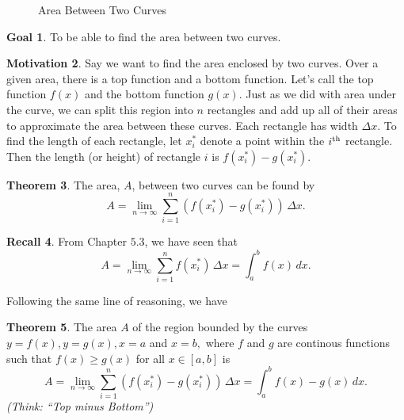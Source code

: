 \documentclass[letterpaper, twoside, 12pt]{book}
\theoremstyle{definition}
\newtheorem{theorem}{Theorem}
\newtheorem{recall}[theorem]{Recall}
\theoremstyle{definition}
\newtheorem{goal}[theorem]{Goal}
\newtheorem{motivation}[theorem]{Motivation}
\begin{document}
\begin{figure}[H]
\caption{Area Between Two Curves}
\label{AreaBetweenCurvesPic}
\end{figure}

\begin{goal}
 To be able to find the area between two curves.
\end{goal}

\begin{motivation}
Say we want to find the area enclosed by two curves.  Over a given area, there is a top function and a bottom function.  Let's call the top function $f(x)$ and the bottom function $g(x)$.  Just as we did with area under the curve, we can split this region into $n$ rectangles and add up all of their areas to approximate the area between these curves.  Each rectangle has width $\Delta x$.  To find the length of each rectangle, let $x_i^*$ denote a point within the $i^{\rm th}$ rectangle.  Then the length (or height) of rectangle $i$ is $f(x_i^*) - g(x_i^*)$.
\end{motivation}

\begin{theorem}
The area, $A$, between two curves can be found by
$$A = \lim_{n \rightarrow \infty} \sum_{i = 1}^{n} \left( f\left(x_i^*\right) - g\left(x_i^*\right) \right) \, \Delta x.$$
\end{theorem}

\begin{recall}
 From Chapter $5.3$, we have seen that $$A = \lim_{n \rightarrow \infty} \sum_{i=1}^{n} f\left(x_i^*\right) \, \Delta x = \int_a^b f(x) \, dx.$$
\end{recall}

Following the same line of reasoning, we have

\begin{theorem}
The area $A$ of the region bounded by the curves $y = f(x), y = g(x), x = a$ and $x = b,$ where $f$ and $g$ are continous functions such that $f(x) \geq g(x)$ for all $x \in \left[a,b\right]$ is $$A = \lim_{n \rightarrow \infty} \sum_{i = 1}^{n} \left( f\left(x_i^*\right) - g\left(x_i^*\right) \right) \, \Delta x = \int_a^b f(x) - g(x) \, dx.$$
\emph{(Think: ``Top minus Bottom'')}
\end{theorem}
\end{document}
